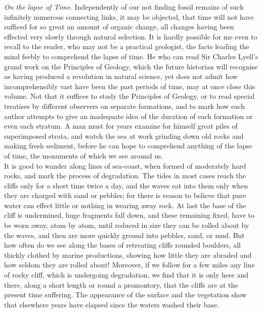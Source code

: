 \indent \emph{On the lapse of Time.} Independently of our not finding fossil remains of such infinitely numerous connecting links, it may be objected, that time will not have sufficed for so great an amount of organic change, all changes having been effected very slowly through natural selection. It is hardly possible for me even to recall to the reader, who may not be a practical geologist, the facts leading the mind feebly to comprehend the lapse of time. He who can read Sir Charles Lyell's grand work on the Principles of Geology, which the future historian will recognise as having produced a revolution in natural science, yet does not admit how incomprehensibly vast have been the past periods of time, may at once close this volume. Not that it suffices to study the Principles of Geology, or to read special treatises by different observers on separate formations, and to mark how each author attempts to give an inadequate idea of the duration of each formation or even each stratum. A man must for years examine for himself great piles of superimposed strata, and watch the sea at work grinding down old rocks and making fresh sediment, before he can hope to comprehend anything of the lapse of time, the monuments of which we see around us.\\
\indent It is good to wander along lines of sea-coast, when formed of moderately hard rocks, and mark the process of degradation. The tides in most cases reach the cliffs only for a short time twice a day, and the waves eat into them only when they are charged with sand or pebbles; for there is reason to believe that pure water can effect little or nothing in wearing away rock. At last the base of the cliff is undermined, huge fragments fall down, and these remaining fixed, have to be worn away, atom by atom, until reduced in size they can be rolled about by the waves, and then are more quickly ground into pebbles, sand, or mud. But how often do we see along the bases of retreating cliffs rounded boulders, all thickly clothed by marine productions, showing how little they are abraded and how seldom they are rolled about!  Moreover, if we follow for a few miles any line of rocky cliff, which is undergoing degradation, we find that it is only here and there, along a short length or round a promontory, that the cliffs are at the present time suffering. The appearance of the surface and the vegetation show that elsewhere years have elapsed since the waters washed their base.\\
